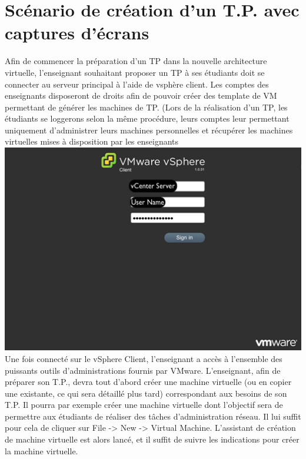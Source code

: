 \section{Scénario de création d'un T.P. avec captures d'écrans}

Afin de commencer la préparation d’un TP dans la nouvelle architecture virtuelle, l’enseignant souhaitant proposer un TP à ses étudiants doit se connecter au serveur principal à l’aide de vsphère client.
Les comptes des enseignants disposeront de droits afin de pouvoir créer des template de VM permettant de générer les machines de TP. (Lors de la réalisation d’un TP, les étudiants se loggerons selon la même procédure, leurs comptes leur permettant uniquement d’administrer leurs machines personnelles et récupérer les machines virtuelles mises à disposition par les enseignants\\

\includegraphics{Login.png}\\


Une fois connecté sur le vSphere Client, l’enseignant a accès à l’ensemble des puissants outils d’administrations fournis par VMware.
L’enseignant, afin de préparer son T.P., devra tout d’abord créer une machine virtuelle (ou en copier une existante, ce qui sera détaillé plus tard) correspondant aux besoins de son T.P. Il pourra par exemple créer une machine virtuelle dont l’objectif sera de permettre aux étudiants de réaliser des tâches d’administration réseau. Il lui suffit pour cela de cliquer sur File -> New -> Virtual Machine. L’assistant de création de machine virtuelle est alors lancé, et il suffit de suivre les indications pour créer la machine virtuelle.\\

